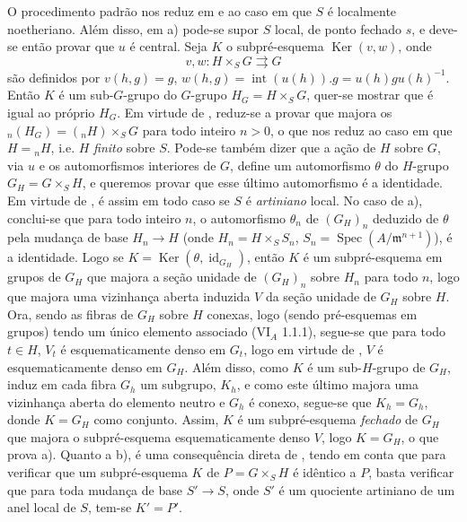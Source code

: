 O procedimento padrão nos reduz em
 e
 ao caso em que
\(S\) é localmente noetheriano. Além disso, em a) pode-se
supor \(S\) local, de ponto fechado \(s\), e deve-se então
provar que \(u\) é central. Seja \(K\) o subpré-esquema
\(\operatorname{Ker}(v,w)\), onde
\[
  v,w:H\times_SG\rightrightarrows G
\]
são definidos por \(v(h,g)=g\), \(w(h,g)=\operatorname{int}(u(h)).g
=u(h)gu(h)^{-1}\). Então \(K\) é um sub-\(G\)-grupo do
\(G\)-grupo \(H_G=H\times_SG\), quer-se mostrar que é igual
ao próprio \(H_G\). Em virtude de
, reduz-se a provar que
majora os \({}_n(H_G)=({}_nH)\times_SG\) para todo inteiro
\(n>0\), o que nos reduz ao caso em que \(H={}_nH\), i.e.
\(H\) \emph{finito} sobre \(S\). Pode-se também dizer que
a ação de \(H\)
sobre \(G\), via \(u\) e os automorfismos interiores de
\(G\), define um automorfismo \(\theta\) do \(H\)-grupo
\(G_H=G\times_SH\), e queremos provar que esse último
automorfismo é a identidade. Em virtude de
, é assim em todo caso
se \(S\) é \emph{artiniano} local. No caso de a), conclui-se
que para todo inteiro \(n\), o automorfismo \(\theta_n\) de
\((G_H)_n\) deduzido de \(\theta\) pela mudança de base
\(H_n\to H\) (onde \(H_n=H\times_SS_n\),
\(S_n=\operatorname{Spec}(A/\mathfrak m^{n+1})\)), é a
identidade. Logo se \(K=\operatorname{Ker}(\theta,
\operatorname{id}_{G_H})\), então \(K\) é um subpré-esquema
em grupos de \(G_H\) que majora a seção unidade de \((G_H)_n\)
sobre \(H_n\) para todo \(n\), logo que majora uma vizinhança
aberta induzida \(V\) da seção unidade de \(G_H\) sobre \(H\).
Ora, sendo as fibras de \(G_H\) sobre \(H\) conexas, logo
(sendo pré-esquemas em grupos) tendo um único elemento
associado (VI\(_A\) 1.1.1), segue-se que para todo \(t\in H\),
\(V_t\) é esquematicamente denso em \(G_t\), logo em virtude
de , \(V\) é
esquematicamente denso em \(G_H\). Além disso, como \(K\) é
um sub-\(H\)-grupo de \(G_H\), induz em cada fibra \(G_h\)
um subgrupo, \(K_h\), e como este último majora uma vizinhança
aberta do elemento neutro e \(G_h\) é conexo, segue-se que
\(K_h=G_h\), donde \(K=G_H\) como conjunto. Assim, \(K\) é
um subpré-esquema \emph{fechado} de \(G_H\) que majora o
subpré-esquema esquematicamente denso \(V\), logo \(K=G_H\),
o que prova a). Quanto a b), é uma consequência direta de
, tendo em conta que
para verificar que um subpré-esquema \(K\) de \(P=G\times_SH\)
é idêntico a \(P\), basta verificar que para toda mudança
de base \(S'\to S\), onde \(S'\) é um quociente artiniano
de um anel local de \(S\), tem-se \(K'=P'\).
